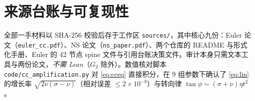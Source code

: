 \documentclass[11pt,a4paper]{ctexart}
\theoremstyle{definition}
\begin{document}
\appendix
\section{来源台账与可复现性}

全部一手材料以 SHA-256 校验后存于工作区 \texttt{sources/}，其中核心九份：Euler 论文（\texttt{euler\_cc.pdf}）、NS 论文（\texttt{ns\_paper.pdf}）、两个仓库的 README 与形式化手册、Euler 的 42 节点 spine 文件与引用台账决策文件。审计本身只需文本工具与两份论文，\emph{不需 Lean}（$G_2$ 除外）。数值核对脚本 \texttt{code/cc\_amplification.py} 对 \eqref{eq:cceq} 直接积分，在 $9$ 组参数下确认了 \eqref{eq:lin} 的增长率 $\sqrt{2\nu(\sigma-\nu)}$（相对误差 $\le2\times10^{-8}$）与转向律 $\tan\phi\sim(\sigma+\nu)\eta t^{2}$。
\end{document}
